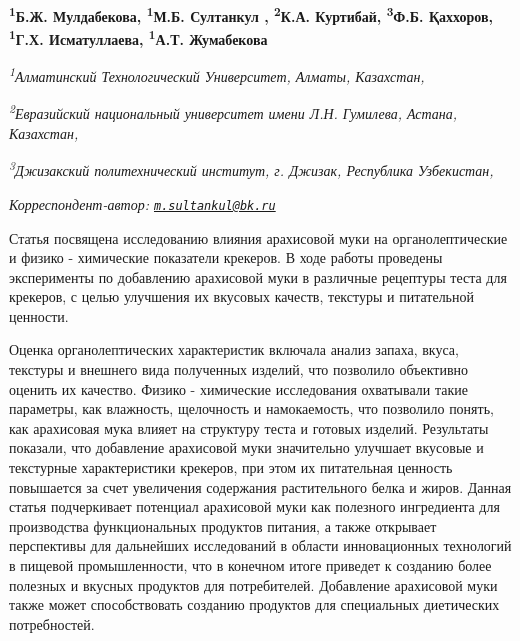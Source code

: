 
\begin{articleheader}

{\bfseries  
\textsuperscript{1}Б.Ж. Мулдабекова\authorid,
\textsuperscript{1}М.Б. Султанкул\textsuperscript{\envelope } \authorid,
\textsuperscript{2}К.А. Куртибай\authorid,
\textsuperscript{3}Ф.Б. Қаххоров\authorid, 
\textsuperscript{1}Г.Х. Исматуллаева\authorid,
\textsuperscript{1}А.Т. Жумабекова\authorid}
\end{articleheader}

\begin{affiliation}
\emph{\textsuperscript{1}Алматинский Технологический Университет, Алматы, Казахстан,}

\emph{\textsuperscript{2}Евразийский национальный университет имени Л.Н. Гумилева, Астана, Казахстан,}

\emph{\textsuperscript{3}Джизакский политехнический институт, г. Джизак, Республика Узбекистан,}

\raggedright \textsuperscript{\envelope }{\em Корреспондент-автор: \href{mailto:m.sultankul@bk.ru}{\nolinkurl{m.sultankul@bk.ru}}}
\end{affiliation}

Статья посвящена исследованию влияния арахисовой муки на
органолептические и физико - химические показатели крекеров. В ходе работы
проведены эксперименты по добавлению арахисовой муки в различные
рецептуры теста для крекеров, с целью улучшения их вкусовых качеств,
текстуры и питательной ценности.

Оценка органолептических характеристик включала анализ запаха, вкуса,
текстуры и внешнего вида полученных изделий, что позволило объективно
оценить их качество. Физико - химические исследования охватывали такие
параметры, как влажность, щелочность и намокаемость, что позволило
понять, как арахисовая мука влияет на структуру теста и готовых изделий.
Результаты показали, что добавление арахисовой муки значительно улучшает
вкусовые и текстурные характеристики крекеров, при этом их питательная
ценность повышается за счет увеличения содержания растительного белка и
жиров. Данная статья подчеркивает потенциал арахисовой муки как
полезного ингредиента для производства функциональных продуктов питания,
а также открывает перспективы для дальнейших исследований в области
инновационных технологий в пищевой промышленности, что в конечном итоге
приведет к созданию более полезных и вкусных продуктов для потребителей.
Добавление арахисовой муки также может способствовать созданию продуктов
для специальных диетических потребностей.


